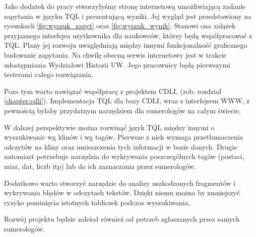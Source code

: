 Jako dodatek do pracy stworzyłyśmy stronę internetową umożliwiającą zadanie zapytania w języku TQL i prezentującą wyniki. 
Jej wygląd jest przedstawiony na rysunkach \ref{fig:wyszuk_zapyt} oraz \ref{fig:wyszuk_wynik}.
Stanowi ona zalążek przyjaznego interfejsu użytkownika dla naukowców, którzy będą współpracować z TQL. Plany jej rozwoju
uwzględniają między innymi funkcjonalność graficznego budowanie zapytania.
Na chwilę obecną serwis internetowy jest w trakcie udostępniania Wydziałowi Historii UW.
Jego pracownicy będą pierwszymi testerami całego rozwiązania.

Poza tym warto nawiązać współpracę z projektem CDLI, (zob. rozdział \ref{chapter:cdli}).
Implementacja TQL dla bazy CDLI, wraz z interfejsem WWW, z pewnością byłaby przydatnym narzędziem dla sumerologów na całym świecie.

W dalszej perspektywie można rozwinąć język TQL między innymi o wyszukiwanie wg klinów i wg tagów. 
Pierwsze z nich wymaga przetłumaczenia odczytów na kliny oraz umieszczenia tych informacji w bazie danych.
Drugie natomiast potrzebuje narzędzia do wykrywania poszczególnych tagów
(postaci, miar, dat, liczb itp) lub do ich zaznaczania przez sumerologów.

Dodatkowo warto stworzyć narzędzie do analizy uszkodzonych fragmentów i wykrywania błędów w odczytach tekstów. 
Dzięki niemu można by zmniejszyć ryzyko pominięcia istotnych tabliczek podczas wyszukiwania. 

Rozwój projektu będzie zależał również od potrzeb zgłaszanych przez samych sumerologów.






